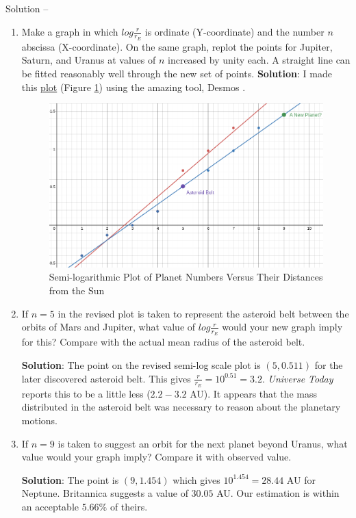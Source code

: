 \documentclass[12pt,a4paper]{book}
\newcommand\Solution[1]{%
   \stepcounter{solution}
    \leavevmode\par\noindent
   {\leftskip37pt
    Solution \textbf{\thesolution} -- #1\par}}
\newcounter{solution}[chapter] %
\begin{document}
\Solution {
    \begin{enumerate}
        \item Make a graph in which $log\frac{r}{r_E}$ is ordinate (Y-coordinate) and the number $n$ abscissa (X-coordinate). On the same graph, replot the points for Jupiter, Saturn, and Uranus at values of $n$ increased by unity each. A straight line can be fitted reasonably well through the new set of points.
            \textbf{Solution}: I made this \href{https://www.desmos.com/calculator/zhewyutbx2}{plot} (Figure \ref{fig: solar-system}) using the amazing tool, Desmos \cite{desmos}.
        \begin{figure}[h!]
            \centering
            \includegraphics[width=0.6\linewidth]{solar-system.png}
            \caption{Semi-logarithmic Plot of Planet Numbers Versus Their Distances from the Sun}
            \label{fig: solar-system}
        \end{figure}
        
    \item \label{item: b} If $n=5$ in the revised plot is taken to represent the asteroid belt between the orbits of Mars and Jupiter, what value of $log \frac{r}{r_E}$ would your new graph imply for this? Compare with the actual mean radius of the asteroid belt.
        
        \textbf{Solution}: The point on the revised semi-log scale plot is $(5, 0.511)$ for the later discovered asteroid belt. This gives $\frac{r}{r_E} = 10^{0.51}=3.2$. \emph{Universe Today} \cite{universe-today} reports this to be a little less ($2.2-3.2$ AU). It appears that the mass distributed in the asteroid belt was necessary to reason about the planetary motions.

    \item \label{item: c} If $n=9$ is taken to suggest an orbit for the next planet beyond Uranus, what value would your graph imply? Compare it with observed value.

        \textbf{Solution}: The point is $(9, 1.454)$ which gives $10^{1.454}=28.44$ AU for Neptune. Britannica \cite{Neptune-data} suggests a value of $30.05$ AU. Our estimation is within an acceptable $5.66\%$ of theirs.


\end{enumerate}}
\end{document}
